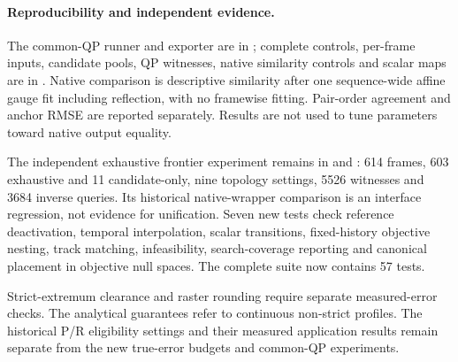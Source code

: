 \paragraph{Reproducibility and independent evidence.}
The common-QP runner and exporter are in ; complete controls, per-frame inputs, candidate pools, QP witnesses, native similarity controls and scalar maps are in . Native comparison is descriptive similarity after one sequence-wide affine gauge fit including reflection, with no framewise fitting. Pair-order agreement and anchor RMSE are reported separately. Results are not used to tune parameters toward native output equality.

The independent exhaustive frontier experiment remains in  and : 614 frames, 603 exhaustive and 11 candidate-only, nine topology settings, 5526 witnesses and 3684 inverse queries. Its historical native-wrapper comparison is an interface regression, not evidence for unification. Seven new tests check reference deactivation, temporal interpolation, scalar transitions, fixed-history objective nesting, track matching, infeasibility, search-coverage reporting and canonical placement in objective null spaces. The complete suite now contains 57 tests.

Strict-extremum clearance and raster rounding require separate measured-error checks. The analytical guarantees refer to continuous non-strict profiles. The historical P/R eligibility settings and their measured application results remain separate from the new true-error budgets and common-QP experiments.
